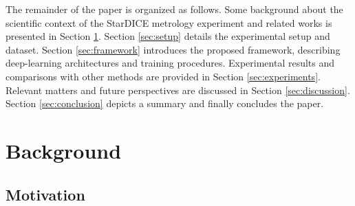 \documentclass[amt, article]{copernicus}
\begin{document}
The remainder of the paper is organized as follows. Some background about the scientific context of the StarDICE metrology experiment and related works is presented in Section \ref{sec:background}. Section \ref{sec:setup} details the experimental setup and dataset. Section \ref{sec:framework} introduces the proposed framework, describing deep-learning architectures and training procedures. Experimental results and comparisons with other methods are provided in Section \ref{sec:experiments}. Relevant matters and future perspectives are discussed in Section \ref{sec:discussion}. Section \ref{sec:conclusion} depicts a summary and finally concludes the paper.

\section{Background}
\label{sec:background}

\subsection{Motivation}
\end{document}
